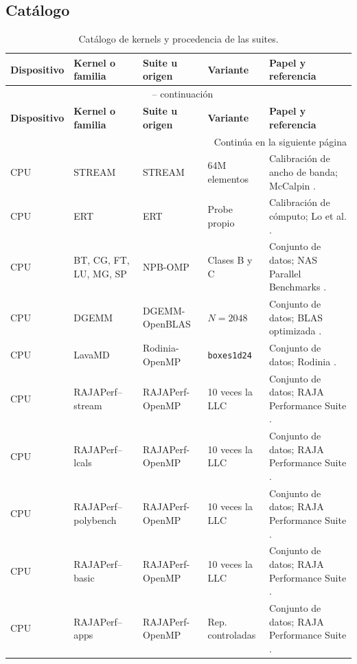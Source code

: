 \subsection{Catálogo}
\label{sec:banco-candidatos}

{\scriptsize
\begin{longtable}{@{}p{1.5cm}p{3.7cm}p{2.6cm}p{2.1cm}p{4.1cm}@{}}
\caption{Catálogo de kernels y procedencia de las suites.}\label{tab:catalogo}\\
\toprule
\textbf{Dispositivo} & \textbf{Kernel o familia} & \textbf{Suite u origen} & \textbf{Variante} & \textbf{Papel y referencia} \\
\midrule
\endfirsthead
\multicolumn{5}{c}{\tablename\ \thetable{} -- continuación}\\
\toprule
\textbf{Dispositivo} & \textbf{Kernel o familia} & \textbf{Suite u origen} & \textbf{Variante} & \textbf{Papel y referencia} \\
\midrule
\endhead
\midrule
\multicolumn{5}{r}{Continúa en la siguiente página}\\
\endfoot
\bottomrule
\endlastfoot
CPU & STREAM & STREAM & 64M elementos & Calibración de ancho de banda; McCalpin \cite{McCalpin1995}. \\
CPU & ERT & ERT & Probe propio & Calibración de cómputo; Lo et al. \cite{Lo2015}. \\
CPU & BT, CG, FT, LU, MG, SP & NPB-OMP & Clases B y C & Conjunto de datos; NAS Parallel Benchmarks \cite{Bailey1991}. \\
CPU & DGEMM & DGEMM-OpenBLAS & $N=2048$ & Conjunto de datos; BLAS optimizada \cite{Goto2008}. \\
CPU & LavaMD & Rodinia-OpenMP & \texttt{boxes1d24} & Conjunto de datos; Rodinia \cite{Che2009}. \\
CPU & RAJAPerf--stream & RAJAPerf-OpenMP & 10 veces la LLC & Conjunto de datos; RAJA Performance Suite \cite{Beckingsale2019}. \\
CPU & RAJAPerf--lcals & RAJAPerf-OpenMP & 10 veces la LLC & Conjunto de datos; RAJA Performance Suite \cite{Beckingsale2019}. \\
CPU & RAJAPerf--polybench & RAJAPerf-OpenMP & 10 veces la LLC & Conjunto de datos; RAJA Performance Suite \cite{Beckingsale2019}. \\
CPU & RAJAPerf--basic & RAJAPerf-OpenMP & 10 veces la LLC & Conjunto de datos; RAJA Performance Suite \cite{Beckingsale2019}. \\
CPU & RAJAPerf--apps & RAJAPerf-OpenMP & Rep. controladas & Conjunto de datos; RAJA Performance Suite \cite{Beckingsale2019}. \\

\end{longtable}}
